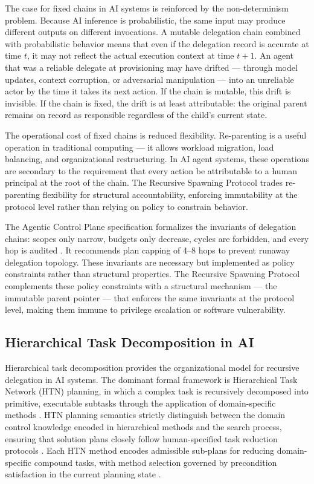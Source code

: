 The case for fixed chains in AI systems is reinforced by the non-determinism problem. Because AI inference is probabilistic, the same input may produce different outputs on different invocations. A mutable delegation chain combined with probabilistic behavior means that even if the delegation record is accurate at time $t$, it may not reflect the actual execution context at time $t+1$. An agent that was a reliable delegate at provisioning may have drifted --- through model updates, context corruption, or adversarial manipulation --- into an unreliable actor by the time it takes its next action. If the chain is mutable, this drift is invisible. If the chain is fixed, the drift is at least attributable: the original parent remains on record as responsible regardless of the child's current state.

The operational cost of fixed chains is reduced flexibility. Re-parenting is a useful operation in traditional computing --- it allows workload migration, load balancing, and organizational restructuring. In AI agent systems, these operations are secondary to the requirement that every action be attributable to a human principal at the root of the chain. The Recursive Spawning Protocol trades re-parenting flexibility for structural accountability, enforcing immutability at the protocol level rather than relying on policy to constrain behavior.

The Agentic Control Plane specification formalizes the invariants of delegation chains: scopes only narrow, budgets only decrease, cycles are forbidden, and every hop is audited \cite{agenticcontrolplane2026}. It recommends plan capping of 4--8 hops to prevent runaway delegation topology. These invariants are necessary but implemented as policy constraints rather than structural properties. The Recursive Spawning Protocol complements these policy constraints with a structural mechanism --- the immutable parent pointer --- that enforces the same invariants at the protocol level, making them immune to privilege escalation or software vulnerability.

\subsection{Hierarchical Task Decomposition in AI}
\label{sec:htn}

Hierarchical task decomposition provides the organizational model for recursive delegation in AI systems. The dominant formal framework is Hierarchical Task Network (HTN) planning, in which a complex task is recursively decomposed into primitive, executable subtasks through the application of domain-specific methods \cite{xu2025htn,emergetmindhtn2025}. HTN planning semantics strictly distinguish between the domain control knowledge encoded in hierarchical methods and the search process, ensuring that solution plans closely follow human-specified task reduction protocols \cite{xu2025htn}. Each HTN method encodes admissible sub-plans for reducing domain-specific compound tasks, with method selection governed by precondition satisfaction in the current planning state \cite{emergetmindhtn2025}.

